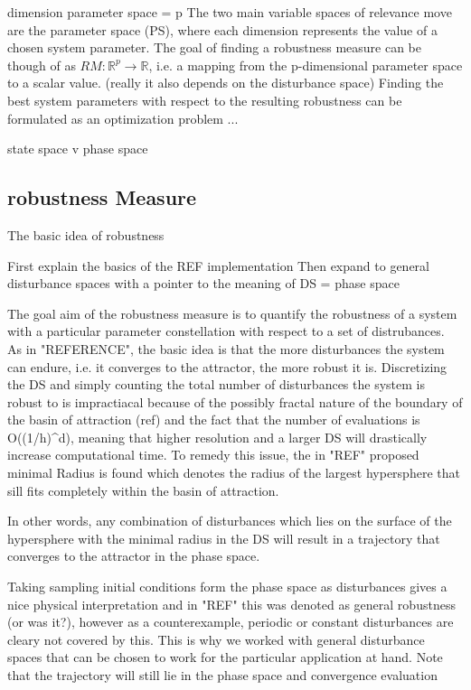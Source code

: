     dimension parameter space = p
    The two main variable spaces of relevance move are the parameter space (PS), where each dimension represents the value of a chosen system parameter. The goal of finding a robustness measure can be though of as $RM:\mathbb{R}^p \rightarrow \mathbb{R}$, i.e. a mapping from the p-dimensional parameter space to a scalar value. (really it also depends on the disturbance space) Finding the best system parameters with respect to the resulting robustness can be formulated as an optimization problem ...


    
    state space v phase space

\subsection{robustness Measure}

    The basic idea of robustness 

    First explain the basics of the REF implementation
    Then expand to general disturbance spaces with a pointer to the meaning of DS = phase space

    
    The goal aim of the robustness measure is to quantify the robustness of a system with a particular parameter constellation with respect to a set of distrubances. As in "REFERENCE", the basic idea is that the more disturbances the system can endure, i.e. it converges to the attractor, the more robust it is. Discretizing the DS and simply counting the total number of disturbances the system is robust to is impractiacal because of the possibly fractal nature of the boundary of the basin of attraction (ref) and the fact that the number of evaluations is O((1/h)^d), meaning that higher resolution and a larger DS will drastically increase computational time. To remedy this issue, the in "REF" proposed minimal Radius is found which denotes the radius of the largest hypersphere that sill fits completely within the basin of attraction.

    In other words, any combination of disturbances which lies on the surface of the hypersphere with the minimal radius in the DS will result in a trajectory that converges to the attractor in the phase space. 

    Taking sampling initial conditions form the phase space as disturbances gives a nice physical interpretation and in "REF" this was denoted as general robustness (or was it?), however as a counterexample, periodic or constant disturbances are cleary not covered by this. 
    This is why we worked with general disturbance spaces that can be chosen to work for the particular application at hand. 
    Note that the trajectory will still lie in the phase space and convergence evaluation 



